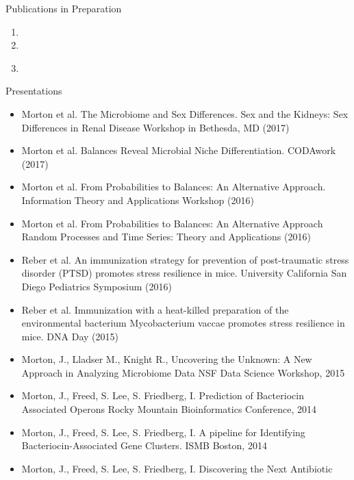 \documentclass{resume} %
\begin{document}
\begin{rSection}{Publications in Preparation}
  \begin{enumerate}
    \item {}
    \item {}
    \item {}\\[5 mm]
  \end{enumerate}
\end{rSection}

\begin{rSection}{Presentations}
  \begin{itemize}
    \setlength\itemsep{0em}
    \item  Morton et al. The Microbiome and Sex Differences.
           Sex and the Kidneys: Sex Differences in Renal Disease Workshop in Bethesda, MD (2017)
    \item  Morton et al. Balances Reveal Microbial Niche Differentiation. CODAwork (2017)
    \item  Morton et al. From Probabilities to Balances: An Alternative Approach. Information Theory and Applications Workshop (2016)
    \item  Morton et al. From Probabilities to Balances: An Alternative Approach Random Processes and Time Series: Theory and Applications (2016)
    \item  Reber et al. An immunization strategy for prevention of post-traumatic stress disorder (PTSD) promotes stress resilience in mice.
                 University California San Diego Pediatrics Symposium  (2016)
    \item  Reber et al. Immunization with a heat-killed preparation of the environmental bacterium Mycobacterium vaccae
                promotes stress resilience in mice. DNA Day (2015)
    \item   Morton, J., Lladser M., Knight R., Uncovering the Unknown: A New Approach in
                Analyzing Microbiome Data NSF Data Science Workshop, 2015
    \item   Morton, J., Freed, S. Lee, S. Friedberg, I. Prediction of Bacteriocin Associated Operons
                Rocky Mountain Bioinformatics Conference, 2014
    \item   Morton, J., Freed, S. Lee, S. Friedberg, I. A pipeline for Identifying Bacteriocin-Associated
                Gene Clusters. ISMB Boston, 2014
    \item   Morton, J., Freed, S. Lee, S. Friedberg, I. Discovering the Next Antibiotic

\end{itemize}
\end{rSection}
\end{document}
